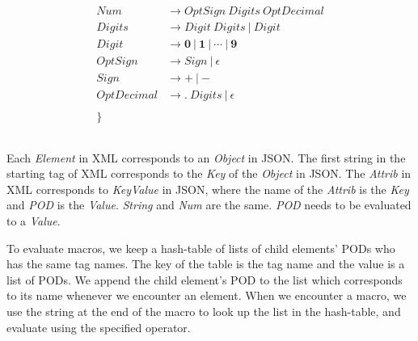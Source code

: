 \documentclass{article}
\begin{document}
\begin{align*}
	\\
	\mathit{Num}        & \rightarrow \mathit{OptSign} ~ \mathit{Digits} ~ \mathit{OptDecimal} \\
	\mathit{Digits}     & \rightarrow \mathit{Digit} ~ \mathit{Digits} ~|~ \mathit{Digit}      \\
	\mathit{Digit}      & \rightarrow \mathbf{0} ~|~ \mathbf{1} ~|~ \cdots ~|~ \mathbf{9}      \\
	\mathit{OptSign}    & \rightarrow \mathit{Sign} ~|~ \epsilon                               \\
	\mathit{Sign}       & \rightarrow \boldsymbol{+} ~|~ \boldsymbol{-}                        \\
	\mathit{OptDecimal} & \rightarrow \boldsymbol{.} ~ \mathit{Digits} ~|~ \epsilon            \\
	\\
	\}
\end{align*}

\subsection{}
Each \textit{Element} in XML corresponds to an \textit{Object}
in JSON. The first string in the starting tag of XML corresponds to the
\textit{Key} of the \textit{Object} in JSON. The
\textit{Attrib} in XML corresponds to \textit{KeyValue} in JSON,
where the name of the \textit{Attrib} is the \textit{Key}
and \textit{POD} is the \textit{Value}.
\textit{String} and \textit{Num} are the same.
\textit{POD} needs to be evaluated to a \textit{Value}.

To evaluate macros, we keep a hash-table of lists of child elements' PODs who
has the same tag names. The key of the table is the tag name and the value is a
list of PODs. We append the child element's POD to the list which corresponds
to its name whenever we encounter an element.  When we encounter a macro, we
use the string at the end of the macro to look up
the list in the hash-table, and evaluate using the specified operator.
\end{document}

